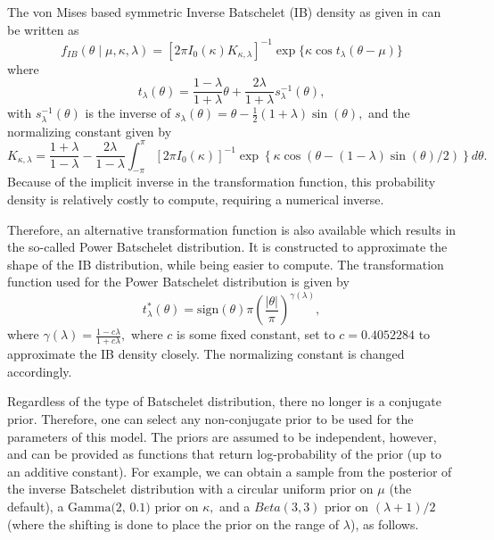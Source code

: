 The von Mises based symmetric Inverse Batschelet (IB) density as given
in \citet{jones2012inverse} can be written as
\begin{equation} \label{eqnjss:invbatpdf}
 f_{IB}(\theta \mid \mu, \kappa, \lambda) = [2\pi I_0(\kappa)K_{\kappa, \lambda}]^{-1} \exp\{\kappa \cos t_\lambda(\theta - \mu)\}
\end{equation} where \begin{equation} \label{eqnjss:invbattransform}
  t_\lambda(\theta) = \frac{1 - \lambda}{1 + \lambda}\theta + \frac{2\lambda}{1 + \lambda} s_\lambda^{-1}(\theta),
\end{equation} with \(s_\lambda^{-1}(\theta)\) is the inverse of
\(s_\lambda(\theta) = \theta - \frac{1}{2} (1 + \lambda) \sin(\theta),\)
and the normalizing constant given by \begin{equation}
   K_{\kappa, \lambda} = \frac{1 + \lambda}{1 - \lambda} - \frac{2\lambda}{1 - \lambda} \int_{-\pi}^\pi [2\pi I_0(\kappa)]^{-1} \exp\left\{\kappa \cos \left(\theta -  (1 - \lambda) \sin(\theta) / 2 \right) \right\} d\theta.
\end{equation} Because of the implicit inverse in the transformation
function, this probability density is relatively costly to compute,
requiring a numerical inverse.

Therefore, an alternative transformation function is also available
which results in the so-called Power Batschelet distribution. It is
constructed to approximate the shape of the IB distribution, while being
easier to compute. The transformation function used for the Power
Batschelet distribution is given by
\begin{equation} \label{eqnjss:powbattransform}
  t_{\lambda}^\ast(\theta) = \text{sign}(\theta)\pi \left( \frac{\vert\theta\vert}{\pi} \right)^{\gamma(\lambda)},
\end{equation} where
\(\gamma(\lambda) = \frac{1 - c\lambda}{1 + c\lambda},\) where \(c\) is
some fixed constant, set to \(c = 0.4052284\) to approximate the IB
density closely. The normalizing constant is changed accordingly.

Regardless of the type of Batschelet distribution, there no longer is a
conjugate prior. Therefore, one can select any non-conjugate prior to be
used for the parameters of this model. The priors are assumed to be
independent, however, and can be provided as functions that return
log-probability of the prior (up to an additive constant). For example,
we can obtain a sample from the posterior of the inverse Batschelet
distribution with a circular uniform prior on \(\mu\) (the default), a
\(\text{Gamma(2, 0.1)}\) prior on \(\kappa,\) and a \(Beta(3, 3)\) prior
on \((\lambda + 1)/2\) (where the shifting is done to place the prior on
the range of \(\lambda\)), as follows.

